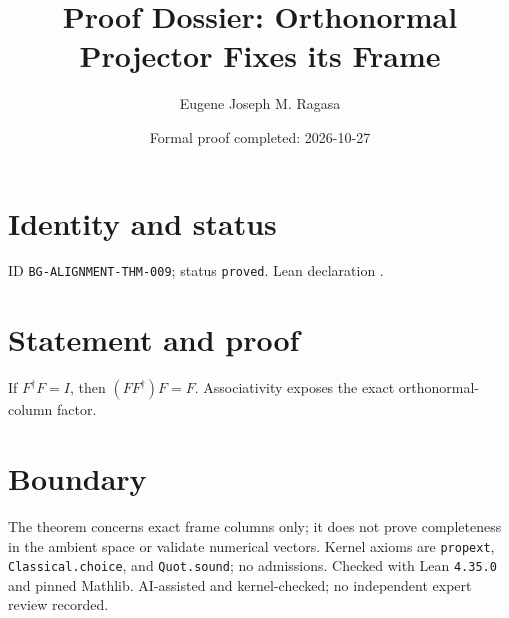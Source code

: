 \documentclass[11pt]{article}
\title{Proof Dossier: Orthonormal Projector Fixes its Frame}\author{Eugene Joseph M. Ragasa}\date{Formal proof completed: 2026-10-27}
\begin{document}
\maketitle
\section{Identity and status}
ID \texttt{BG-ALIGNMENT-THM-009}; status \texttt{proved}. Lean declaration .
\section{Statement and proof}
If $F^\dagger F=I$, then $(FF^\dagger)F=F$. Associativity exposes the exact orthonormal-column factor.
\section{Boundary}
The theorem concerns exact frame columns only; it does not prove completeness in the ambient space or validate numerical vectors. Kernel axioms are \texttt{propext}, \texttt{Classical.choice}, and \texttt{Quot.sound}; no admissions. Checked with Lean \texttt{4.35.0} and pinned Mathlib. AI-assisted and kernel-checked; no independent expert review recorded.
\end{document}
